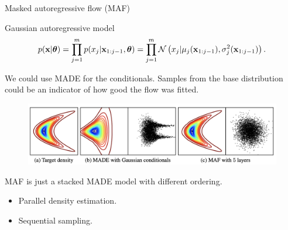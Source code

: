 \begin{frame}{Masked autoregressive flow (MAF)}
	\begin{block}{Gaussian autoregressive model}
		\vspace{-0.7cm}
		\[
		p(\mathbf{x} | \boldsymbol{\theta}) = \prod_{j=1}^m p(x_j | \mathbf{x}_{1:j - 1}, \boldsymbol{\theta}) = \prod_{j=1}^m \mathcal{N} \left(x_j | \mu_j(\mathbf{x}_{1:j-1}), \sigma^2_j (\mathbf{x}_{1:j-1})\right).
		\]
		\vspace{-0.5cm}
	\end{block}
	We could use MADE for the conditionals. 
	Samples from the base distribution could be an indicator of how good the flow was fitted. 
	\vspace{-0.3cm}
	\begin{figure}
		\includegraphics[width=0.95\linewidth]{figs/maf1.png}
	\end{figure}
	MAF is just a stacked MADE model with different ordering.
	\begin{itemize}
		\item Parallel density estimation.
		\item Sequential sampling.
	\end{itemize}
\end{frame}
